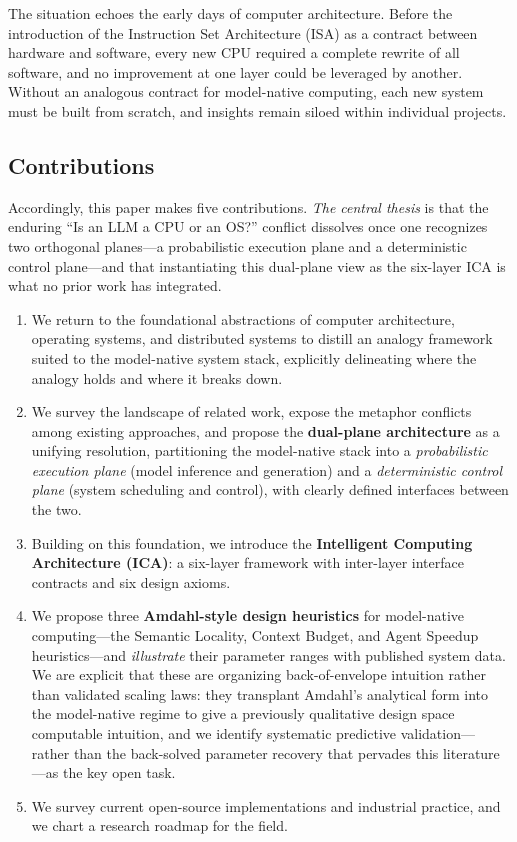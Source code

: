 The situation echoes the early days of computer architecture.
Before the introduction of the Instruction Set Architecture (ISA) as a contract between hardware and software, every new CPU required a complete rewrite of all software, and no improvement at one layer could be leveraged by another.
Without an analogous contract for model-native computing, each new system must be built from scratch, and insights remain siloed within individual projects.

\subsection{Contributions}

Accordingly, this paper makes five contributions. \emph{The central thesis} is that the enduring ``Is an LLM a CPU or an OS?'' conflict dissolves once one recognizes two orthogonal planes---a probabilistic execution plane and a deterministic control plane---and that instantiating this dual-plane view as the six-layer ICA is what no prior work has integrated.

\begin{enumerate}
\item We return to the foundational abstractions of computer architecture, operating systems, and distributed systems to distill an analogy framework suited to the model-native system stack, explicitly delineating where the analogy holds and where it breaks down.

\item We survey the landscape of related work, expose the metaphor conflicts among existing approaches, and propose the \textbf{dual-plane architecture} as a unifying resolution, partitioning the model-native stack into a \emph{probabilistic execution plane} (model inference and generation) and a \emph{deterministic control plane} (system scheduling and control), with clearly defined interfaces between the two.

\item Building on this foundation, we introduce the \textbf{Intelligent Computing Architecture (ICA)}: a six-layer framework with inter-layer interface contracts and six design axioms.

\item We propose three \textbf{Amdahl-style design heuristics} for model-native computing---the Semantic Locality, Context Budget, and Agent Speedup heuristics---and \emph{illustrate} their parameter ranges with published system data. We are explicit that these are organizing back-of-envelope intuition rather than validated scaling laws: they transplant Amdahl's analytical form into the model-native regime to give a previously qualitative design space computable intuition, and we identify systematic predictive validation---rather than the back-solved parameter recovery that pervades this literature---as the key open task.

\item We survey current open-source implementations and industrial practice, and we chart a research roadmap for the field.
\end{enumerate}
